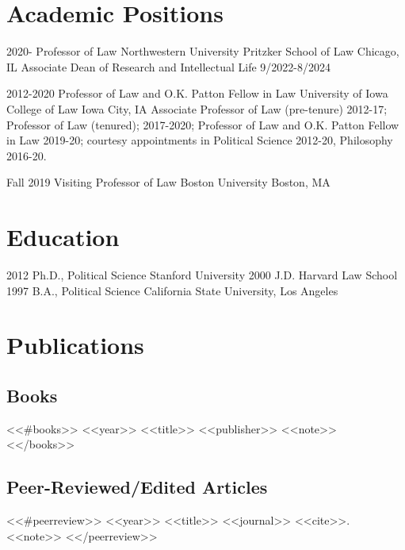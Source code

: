 \documentclass[letterpaper]{moderncv}
\begin{document}
\makecvtitle

\lfoot{\thepage}

%
%
\section{Academic Positions}
\cventry
{2020-}
{Professor of Law}
{Northwestern University Pritzker School of Law}
{Chicago, IL}
{}
{Associate Dean of Research and Intellectual Life 9/2022-8/2024}

\cventry
{2012-2020}
{Professor of Law and O.K. Patton Fellow in Law}
{University of Iowa College of Law}
{Iowa City, IA}
{}
{Associate Professor of Law (pre-tenure) 2012-17; Professor of Law (tenured); 2017-2020; Professor of Law and O.K. Patton Fellow in Law 2019-20; courtesy appointments in Political Science 2012-20, Philosophy 2016-20.}
%

\cventry
{Fall 2019}
{Visiting Professor of Law}
{Boston University}
{Boston, MA}
{}
{}
\vspace{1mm}

%
%
\section{Education}
\cventry
{2012}
{Ph.D., Political Science}
{Stanford University}
{}
{}
{}
\cventry
{2000}
{J.D.}
{Harvard Law School}
{}
{}
{}
\cventry
{1997}
{B.A., Political Science}
{California State University, Los Angeles}
{}
{}
{}
\vspace{1mm}
%
%
\section{Publications}
\vspace{1mm}
\subsection{Books}
<<#books>>
\cventry
{<<year>>}
{<<title>>}
{}
{<<publisher>>}
{}
{<<note>>}
\vspace{1mm}
<</books>>
\vspace{1mm}
\subsection{Peer-Reviewed/Edited Articles}
<<#peerreview>>
\cventry
{<<year>>}
{<<title>>}
{}
{<<journal>>}
{}
{<<cite>>. <<note>>}
\vspace{1mm}
<</peerreview>>
\vspace{1mm}
\end{document}
